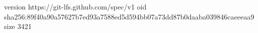 version https://git-lfs.github.com/spec/v1
oid sha256:89f40a90a57627b7ed93a7588ed5d594bb07a73dd87b0daaba039846caeeeaa9
size 3421
